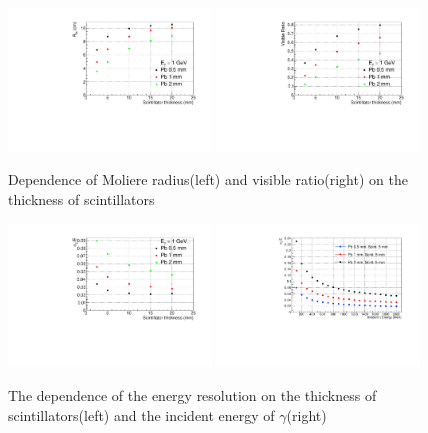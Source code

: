\documentclass[jkps,preprint,fleqn,showpacs,showkeys]{revtex4}
\begin{document}
\begin{figure}[!hbt]
\includegraphics[width=0.48\textwidth]{figures/3.2/moliere_radius.pdf}
\includegraphics[width=0.48\textwidth]{figures/3.2/visible_ratio.pdf}
\caption{Dependence of Moliere radius(left) and visible ratio(right) on the thickness of scintillators}
\label{fig:moliere_vis}
\end{figure}

\begin{figure}[!hbt]
\includegraphics[width=0.48\textwidth]{figures/3.2/eres_thickness.pdf}
\includegraphics[width=0.48\textwidth]{figures/3.2/energy_resolution.pdf}
\caption{The dependence of the energy resolution on the thickness of scintillators(left) and the incident energy of $\gamma$(right)}
\label{fig:energy_res}
\end{figure}
\end{document}
